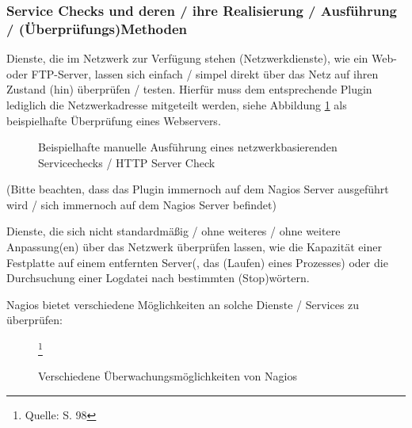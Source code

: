 \subsubsection{Service Checks und deren / ihre Realisierung / Ausführung / (Überprüfungs)Methoden}

Dienste, die im Netzwerk zur Verfügung stehen (Netzwerkdienste), wie ein Web- oder FTP-Server, lassen sich einfach / simpel direkt über das Netz auf ihren Zustand (hin) überprüfen /  testen.
Hierfür muss dem entsprechende Plugin lediglich die Netzwerkadresse mitgeteilt werden, siehe Abbildung \ref{check-http} als beispielhafte Überprüfung eines Webservers.

\begin{figure}[ht]
	\centering
		\caption{Beispielhafte manuelle Ausführung eines netzwerkbasierenden Servicechecks / HTTP Server Check}
		\label{check-http}
\end{figure}

(Bitte beachten, dass das Plugin immernoch auf dem Nagios Server ausgeführt wird / sich immernoch auf dem Nagios Server befindet)

Dienste, die sich nicht standardmäßig / ohne weiteres / ohne weitere Anpassung(en) über das Netzwerk überprüfen lassen, wie die Kapazität einer Festplatte auf einem entfernten Server(, das (Laufen) eines Prozesses) oder die Durchsuchung einer Logdatei nach bestimmten (Stop)wörtern.

Nagios bietet verschiedene Möglichkeiten an solche Dienste /  Services zu überprüfen:

\begin{figure}[ht]
	\centering
		\caption{Verschiedene Überwachungsmöglichkeiten von Nagios}\footnote{Quelle: \cite{Barth08} S. 98}
		\label{nagios-kern}
\end{figure} 

